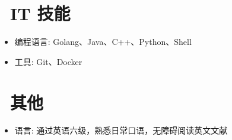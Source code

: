 \documentclass{resume}
\begin{document}


\section{\faCogs\ IT 技能}
\begin{itemize}[parsep=0.5ex]
  \item 编程语言: Golang、Java、C++、Python、Shell
  \item 工具: Git、Docker
\end{itemize}


\section{\faInfo\ 其他}
\begin{itemize}[parsep=0.5ex]
  \item 语言: 通过英语六级，熟悉日常口语，无障碍阅读英文文献
\end{itemize}

%
%
\end{document}
